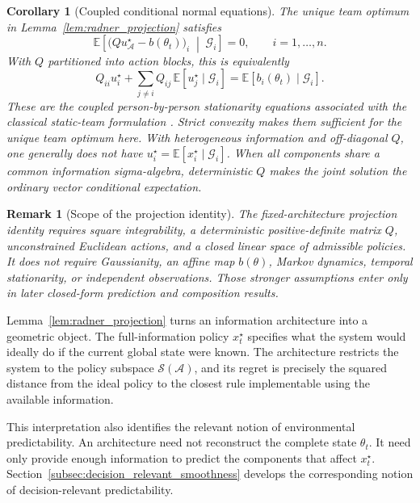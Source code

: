 \documentclass[11pt]{article}
\newtheorem{corollary}{Corollary}
\newtheorem{remark}{Remark}
\begin{document}
\begin{corollary}[Coupled conditional normal equations]
\label{cor:conditional_normal_equations}
The unique team optimum in Lemma~\ref{lem:radner_projection} satisfies
\begin{equation}
    \boxed{
    \mathbb E\!\left[
      \bigl(Q u_{\mathcal A}^{\star}-b(\theta_t)\bigr)_i
      \;\middle|\;
      \mathcal G_i
    \right]
    =0,
    \qquad i=1,\ldots,n.
    }
    \label{eq:conditional_normal_equations}
\end{equation}
With $Q$ partitioned into action blocks, this is equivalently
\begin{equation}
Q_{ii}u_i^\star
+
\sum_{j\ne i}Q_{ij}\,
\mathbb E[u_j^\star\mid\mathcal G_i]
=
\mathbb E[b_i(\theta_t)\mid\mathcal G_i].
\label{eq:block_conditional_normal_equations}
\end{equation}
These are the coupled person-by-person stationarity equations associated with
the classical static-team formulation \cite{radner1962team}. Strict convexity
makes them sufficient for the unique team optimum here. With heterogeneous
information and
off-diagonal $Q$, one generally does not have
$u_i^\star=\mathbb E[x_i^\star\mid\mathcal G_i]$. When all components share a
common information sigma-algebra, deterministic $Q$ makes the joint solution
the ordinary vector conditional expectation.
\end{corollary}

\begin{remark}[Scope of the projection identity]
The fixed-architecture projection identity requires square integrability, a
deterministic positive-definite matrix $Q$, unconstrained Euclidean actions,
and a closed linear space of admissible policies. It does not require
Gaussianity, an affine map $b(\theta)$, Markov dynamics, temporal stationarity,
or independent observations. Those stronger assumptions enter only in later
closed-form prediction and composition results.
\end{remark}

Lemma~\ref{lem:radner_projection} turns an information architecture into a
geometric object. The full-information policy $x_t^\star$ specifies what the
system would ideally do if the current global state were known. The
architecture restricts the system to the policy subspace
$\mathcal{S}(\mathcal{A})$, and its regret is precisely the squared distance
from the ideal policy to the closest rule implementable using the available
information.

This interpretation also identifies the relevant notion of environmental
predictability. An architecture need not reconstruct the complete state
$\theta_t$. It need only provide enough information to predict the components
that affect $x_t^\star$. Section~\ref{subsec:decision_relevant_smoothness}
develops the corresponding notion of decision-relevant predictability.
\end{document}

